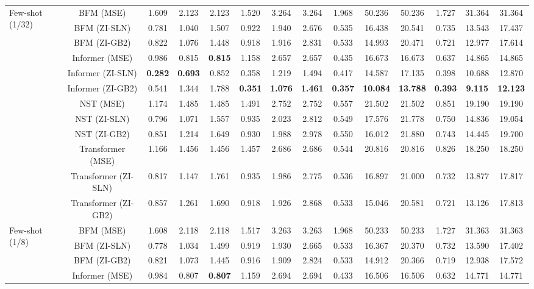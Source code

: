 \begin{table}[htbp]
{\begin{tabular}{lccccccccccccc}
\midrule
\multirow{9}{*}{Few-shot (1/32)} & BFM (MSE) & 1.609 & 2.123 & 2.123 & 1.520 & 3.264 & 3.264 & 1.968 & 50.236 & 50.236 & 1.727 & 31.364 & 31.364 \\
 & BFM (ZI-SLN) & 0.781 & 1.040 & 1.507 & 0.922 & 1.940 & 2.676 & 0.535 & 16.438 & 20.541 & 0.735 & 13.543 & 17.437 \\
 & BFM (ZI-GB2) & 0.822 & 1.076 & 1.448 & 0.918 & 1.916 & 2.831 & 0.533 & 14.993 & 20.471 & 0.721 & 12.977 & 17.614 \\
 & Informer (MSE) & 0.986 & 0.815 & \textbf{0.815} & 1.158 & 2.657 & 2.657 & 0.435 & 16.673 & 16.673 & 0.637 & 14.865 & 14.865 \\
 & Informer (ZI-SLN) & \textbf{0.282} & \textbf{0.693} & 0.852 & 0.358 & 1.219 & 1.494 & 0.417 & 14.587 & 17.135 & 0.398 & 10.688 & 12.870 \\
 & Informer (ZI-GB2) & 0.541 & 1.344 & 1.788 & \textbf{0.351} & \textbf{1.076} & \textbf{1.461} & \textbf{0.357} & \textbf{10.084} & \textbf{13.788} & \textbf{0.393} & \textbf{9.115} & \textbf{12.123} \\
 & NST (MSE) & 1.174 & 1.485 & 1.485 & 1.491 & 2.752 & 2.752 & 0.557 & 21.502 & 21.502 & 0.851 & 19.190 & 19.190 \\
 & NST (ZI-SLN) & 0.796 & 1.071 & 1.557 & 0.935 & 2.023 & 2.812 & 0.549 & 17.576 & 21.778 & 0.750 & 14.836 & 19.054 \\
 & NST (ZI-GB2) & 0.851 & 1.214 & 1.649 & 0.930 & 1.988 & 2.978 & 0.550 & 16.012 & 21.880 & 0.743 & 14.445 & 19.700 \\
 & Transformer (MSE) & 1.166 & 1.456 & 1.456 & 1.457 & 2.686 & 2.686 & 0.544 & 20.816 & 20.816 & 0.826 & 18.250 & 18.250 \\
 & Transformer (ZI-SLN) & 0.817 & 1.147 & 1.761 & 0.935 & 1.986 & 2.775 & 0.536 & 16.897 & 21.000 & 0.732 & 13.877 & 17.817 \\
 & Transformer (ZI-GB2) & 0.857 & 1.261 & 1.690 & 0.918 & 1.926 & 2.868 & 0.533 & 15.046 & 20.581 & 0.721 & 13.126 & 17.813 \\
\midrule
\multirow{9}{*}{Few-shot (1/8)} & BFM (MSE) & 1.608 & 2.118 & 2.118 & 1.517 & 3.263 & 3.263 & 1.968 & 50.233 & 50.233 & 1.727 & 31.363 & 31.363 \\
 & BFM (ZI-SLN) & 0.778 & 1.034 & 1.499 & 0.919 & 1.930 & 2.665 & 0.533 & 16.367 & 20.370 & 0.732 & 13.590 & 17.402 \\
 & BFM (ZI-GB2) & 0.821 & 1.073 & 1.445 & 0.916 & 1.909 & 2.824 & 0.533 & 14.912 & 20.366 & 0.719 & 12.938 & 17.572 \\
 & Informer (MSE) & 0.984 & 0.807 & \textbf{0.807} & 1.159 & 2.694 & 2.694 & 0.433 & 16.506 & 16.506 & 0.632 & 14.771 & 14.771 \\

\end{tabular}}
\end{table}
